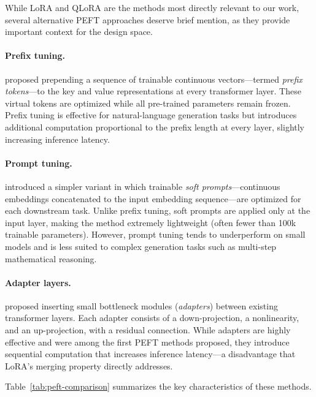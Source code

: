 While LoRA and QLoRA are the methods most directly relevant to our work,
several alternative PEFT approaches deserve brief mention, as they
provide important context for the design space.

\paragraph{Prefix tuning.}
\citet{li2021prefix} proposed prepending a sequence of trainable
continuous vectors---termed \emph{prefix tokens}---to the key and value
representations at every transformer layer.  These virtual tokens are
optimized while all pre-trained parameters remain frozen.  Prefix tuning
is effective for natural-language generation tasks but introduces
additional computation proportional to the prefix length at every layer,
slightly increasing inference latency.

\paragraph{Prompt tuning.}
\citet{lester2021prompt} introduced a simpler variant in which trainable
\emph{soft prompts}---continuous embeddings concatenated to the input
embedding sequence---are optimized for each downstream task.  Unlike
prefix tuning, soft prompts are applied only at the input layer, making
the method extremely lightweight (often fewer than 100k trainable
parameters).  However, prompt tuning tends to underperform on small
models and is less suited to complex generation tasks such as
multi-step mathematical reasoning.

\paragraph{Adapter layers.}
\citet{houlsby2019adapters} proposed inserting small bottleneck modules
(\emph{adapters}) between existing transformer layers.  Each adapter
consists of a down-projection, a nonlinearity, and an up-projection,
with a residual connection.  While adapters are highly effective and were
among the first PEFT methods proposed, they introduce sequential
computation that increases inference latency---a disadvantage that LoRA's
merging property directly addresses.

\medskip
\noindent
Table~\ref{tab:peft-comparison} summarizes the key characteristics of
these methods.

